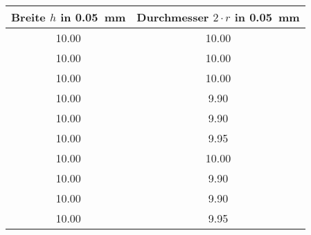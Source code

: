 \begin{center}
\begin{tabular}{c|c}
	Breite $h$ in \SI{0.05}{\milli\metre}& Durchmesser $2 \cdot r$ in \SI{0.05}{\milli\metre}	\\
	\hline
	10.00 & 10.00 \\
	10.00  & 10.00 \\
	10.00  & 10.00 \\
	10.00  & 9.90 \\
	10.00  & 9.90 \\
	10.00  & 9.95 \\
	10.00  & 10.00 \\
	10.00  & 9.90 \\
	10.00  & 9.90 \\
	10.00 & 9.95 \\
\end{tabular}
\label{tab:querschnitte}
\end{center}
